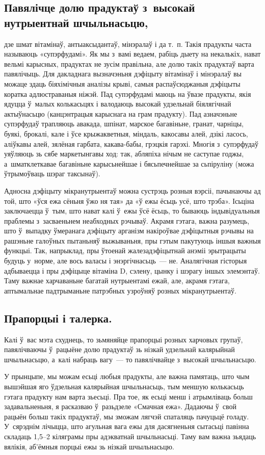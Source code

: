 \subsection{Павялічце долю прадуктаў з~высокай нутрыентнай шчыльнасьцю,} дзе шмат вітамінаў, антыаксыдантаў, мінэралаў і да т.~п. Такія прадукты часта называюць «супэрфудамі». Як мы з~вамі ведаем, рабіць дыету на некалькіх, нават вельмі карысных, прадуктах не зусім правільна, але долю такіх прадуктаў варта павялічыць. Для дакладнага вызначэньня дэфіцыту вітамінаў і мінэралаў вы можаце здаць біяхімічныя аналізы крыві, самыя распаўсюджаныя дэфіцыты коратка адлюстраваныя ніжэй. Пад супэрфудамі маюць на ўвазе прадукты, якія ядуцца ў~малых колькасьцях і валодаюць высокай удзельнай біялягічнай актыўнасьцю (канцэнтрацыя карыснага на грам прадукту). Пад азначэньне супэрфудаў трапляюць авакада, шпінат, марское багавіньне, гранат, чарніцы, буякі, брокалі, кале і ўсе крыжакветныя, міндаль, какосавы алей, дзікі ласось, аліўкавы алей, зялёная гарбата, какава-бабы, грэцкія гарэхі. Многія з~супэрфудаў уяўляюць зь сябе маркетынгавы ход: так, абляпіха нічым не саступае годжы, а~шматклеткавае багавіньне карысьнейшае і бясьпечнейшае за сьпіруліну (можа ўтрымоўваць шэраг таксынаў).

Адносна дэфіцыту мікранутрыентаў можна сустрэць розныя вэрсіі, пачынаючы ад той, што «ўся ежа сёньня ўжо ня тая» да «ў ежы ёсьць усё, што трэба». Ісьціна заключаецца ў~тым, што нават калі ў~ежы ўсё ёсьць, то бываюць індывідуальныя праблемы з~засваеньнем неабходных рэчываў. Акрамя гэтага, важна разумець, што ў~выпадку ўмеранага дэфіцыту арганізм накіроўвае дэфіцытныя рэчывы на рашэньне галоўных пытаньняў выжываньня, пры гэтым пакутуюць іншыя важныя функцыі. Так, напрыклад, пры ўтоенай жалезадэфіцытнай анэміі эрытрацыты будуць у~норме, але вось валасы і энэргічнасьць~--- не. Аналягічная гісторыя адбываецца і пры дэфіцыце вітаміна D, сэлену, цынку і шэрагу іншых элемэнтаў. Таму важнае харчаваньне багатай нутрыентамі ежай, але, акрамя гэтага, аптымальнае падтрыманьне патрэбных узроўняў розных мікранутрыентаў.

\subsection{Прапорцыі і талерка.}
Калі ў~вас мэта схуднець, то зьмяняйце прапорцыі розных харчовых групаў, павялічваючы ў~рацыёне долю прадуктаў зь нізкай удзельнай калярыйнай шчыльнасьцю, а~калі набраць вагу~--- то павялічвайце з~высокай шчыльнасьцю.

У прынцыпе, мы можам есьці любыя прадукты, але важна памятаць, што чым вышэйшая яго ўдзельная калярыйная шчыльнасьць, тым меншую колькасьць гэтага прадукту нам варта зьесьці. Пра тое, як есьці менш і атрымліваць больш задавальненьня, я расказваю ў~разьдзеле «Смачная ежа». Дадаючы ў~свой рацыён больш такіх прадуктаў, мы зможам лягчэй спаталяць пачуцьцё голаду. У~сярэднім лічыцца, што агульная вага ежы для дасягненьня сытасьці павінна складаць 1,5--2 кіляграмы пры адэкватнай шчыльнасьці. Таму вам важна зьядаць вялікія, аб'ёмныя порцыі ежы зь нізкай шчыльнасьцю.

